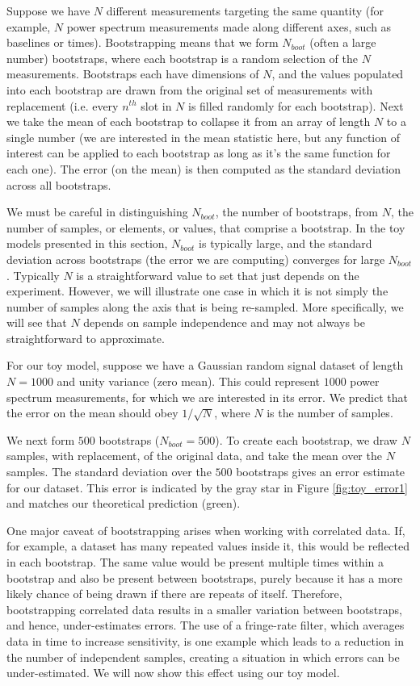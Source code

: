 \documentclass[preprint2,numberedappendix,tighten]{aastex6}  %
\begin{document}
Suppose we have $N$ different measurements targeting the same quantity (for example, $N$ power spectrum measurements made along different axes, such as baselines or times). 
Bootstrapping means that we form $N_{boot}$ (often a large number) bootstraps, where each bootstrap is a random selection 
of the $N$ measurements. Bootstraps each have dimensions of $N$, and the values populated into each bootstrap are drawn 
from the original set of measurements with replacement (i.e. every $n^{th}$ slot in $N$ is filled randomly for each bootstrap). Next we take 
the mean of each bootstrap to collapse it from an array of length $N$ to a single number (we are interested in the mean statistic 
here, but any function of interest can be applied to each bootstrap as long as it's the same function for each one). The error (on 
the mean) is then computed as the standard deviation across all bootstraps. 

We must be careful in distinguishing $N_{boot}$, the number of bootstraps, from $N$, the number of samples, or elements, or 
values, that comprise a bootstrap. In the toy models presented in this section, $N_{boot}$ is typically large, and the standard 
deviation across bootstraps (the error we are computing) converges for large $N_{boot}$. Typically $N$ is a straightforward value to set that just depends on the experiment. However, we will illustrate one case in which it is not simply the number of samples along the axis that is being re-sampled. More specifically, we will see that $N$ depends on sample independence and may not always be straightforward to approximate. 

For our toy model, suppose we have a Gaussian random signal dataset of length $N=1000$ and unity variance (zero mean). 
This could represent $1000$ power spectrum measurements, for which we are interested in its error. We predict that the error 
on the mean should obey $1/\sqrt{N}$, where $N$ is the number of samples.

We next form $500$ bootstraps ($N_{boot} = 500$). To create each bootstrap, we draw $N$ samples, with replacement, of the 
original data, and take the mean over the $N$ samples. The standard deviation over the $500$ bootstraps gives an error 
estimate for our dataset. This error is indicated by the gray star in Figure \ref{fig:toy_error1} and matches our theoretical 
prediction (green).

One major caveat of bootstrapping arises when working with correlated data. If, for example, a dataset has many repeated 
values inside it, this would be reflected in each bootstrap. The same value would be present multiple times within a bootstrap 
and also be present between bootstraps, purely because it has a more likely chance of being drawn if there are repeats of 
itself. Therefore, bootstrapping correlated data results in a smaller variation between bootstraps, and hence, under-estimates 
errors. The use of a fringe-rate filter, which averages data in time to increase sensitivity, is one example which leads to a 
reduction in the number of independent samples, creating a situation in which errors can be under-estimated. We will now show 
this effect using our toy model.
\end{document}
